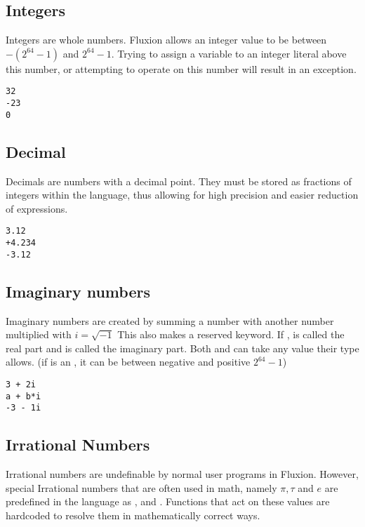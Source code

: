 \documentclass[11pt,a4paper]{book}
\begin{document}
\subsection{Integers}

Integers are whole numbers. Fluxion allows an integer value to be between $-(2^{64} - 1)$ and $2^{64} - 1$. Trying to assign a variable to an integer literal above this number, or attempting to operate on this number will result in an exception.

\begin{lstlisting}[caption={Example integers},captionpos=b]
32
-23
0
\end{lstlisting}

\subsection{Decimal}

Decimals are numbers with a decimal point. They must be stored as fractions of integers within the language, thus allowing for high precision and easier reduction of expressions.

\begin{lstlisting}[caption={Example decimals},captionpos=b]
3.12
+4.234
-3.12
\end{lstlisting}

\subsection{Imaginary numbers}

Imaginary numbers are created by summing a number with another number multiplied with $i = \sqrt{-1}$ This also makes  a reserved keyword. If ,  is called the real part and  is called the imaginary part. Both  and  can take any value their type allows. (if  is an , it can be between negative and positive $2^{64} - 1$)

\begin{lstlisting}[caption={Example imaginals},captionpos=b]
3 + 2i
a + b*i
-3 - 1i
\end{lstlisting}

\subsection{Irrational Numbers}

Irrational numbers are undefinable by normal user programs in Fluxion. However, special Irrational numbers that are often used in math, namely $\pi, \tau$ and $e$ are predefined in the language as ,  and . Functions that act on these values are hardcoded to resolve them in mathematically correct ways.
\end{document}
